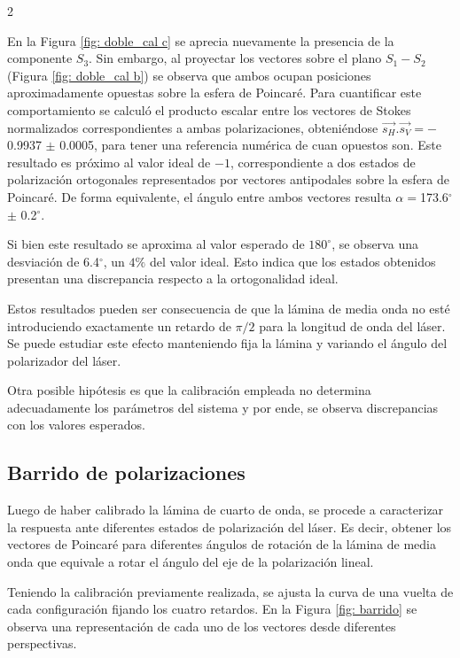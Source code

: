 \documentclass[11pt,a4paper]{article}
\begin{document}
\begin{multicols}{2}

En la Figura \ref{fig: doble_cal c} se aprecia nuevamente la presencia de la componente $S_3$. Sin embargo, al proyectar los vectores sobre el plano $S_1-S_2$ (Figura \ref{fig: doble_cal b}) se observa que ambos ocupan posiciones aproximadamente opuestas sobre la esfera de Poincaré. Para cuantificar este comportamiento se calculó el producto escalar entre los vectores de Stokes normalizados correspondientes a ambas polarizaciones, obteniéndose $\vec{s_H} . \vec{s_V}=-$0.9937 $\pm$ 0.0005, para tener una referencia numérica de cuan opuestos son. Este resultado es próximo al valor ideal de $-1$, correspondiente a dos estados de polarización ortogonales representados por vectores antipodales sobre la esfera de Poincaré. De forma equivalente, el ángulo entre ambos vectores resulta $\alpha=$173.6$^\circ$ $\pm$ 0.2$^\circ$.

Si bien este resultado se aproxima al valor esperado de $180^\circ$, se observa una desviación de 6.4$^\circ$, un $4\%$ del valor ideal. Esto indica que los estados obtenidos presentan una discrepancia respecto a la ortogonalidad ideal. 

Estos resultados pueden ser consecuencia de que la lámina de media onda no esté introduciendo exactamente un retardo de $\pi/2$ para la longitud de onda del láser. Se puede estudiar este efecto manteniendo fija la lámina y variando el ángulo del polarizador del láser.

Otra posible hipótesis es que la calibración empleada no determina adecuadamente los parámetros del sistema y por ende, se observa discrepancias con los valores esperados.




\subsection{Barrido de polarizaciones}

Luego de haber calibrado la lámina de cuarto de onda, se procede a caracterizar la respuesta ante diferentes estados de polarización del láser. Es decir, obtener los vectores de Poincaré para diferentes ángulos de rotación de la lámina de media onda que equivale a rotar el ángulo del eje de la polarización lineal.

Teniendo la calibración previamente realizada, se ajusta la curva de una vuelta de cada configuración fijando los cuatro retardos. En la Figura \ref{fig: barrido} se observa una representación de cada uno de los vectores desde diferentes perspectivas. 

\end{multicols}
\end{document}
